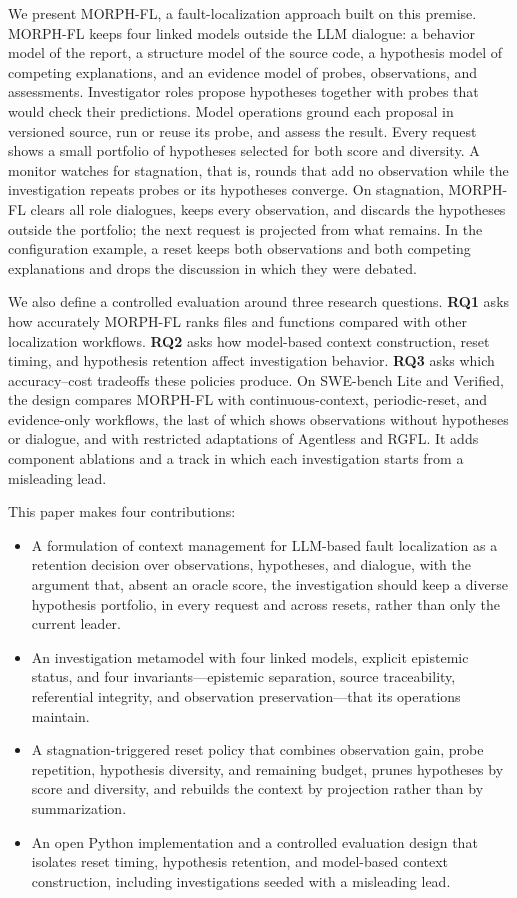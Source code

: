 \documentclass[letterpaper,journal]{IEEEtran}
\newcommand{\tool}{MORPH-FL}
\begin{document}
We present \tool{}, a fault-localization approach built on this premise. \tool{} keeps four linked models outside the LLM dialogue: a behavior model of the report, a structure model of the source code, a hypothesis model of competing explanations, and an evidence model of probes, observations, and assessments. Investigator roles propose hypotheses together with probes that would check their predictions. Model operations ground each proposal in versioned source, run or reuse its probe, and assess the result. Every request shows a small portfolio of hypotheses selected for both score and diversity. A monitor watches for stagnation, that is, rounds that add no observation while the investigation repeats probes or its hypotheses converge. On stagnation, \tool{} clears all role dialogues, keeps every observation, and discards the hypotheses outside the portfolio; the next request is projected from what remains. In the configuration example, a reset keeps both observations and both competing explanations and drops the discussion in which they were debated.

We also define a controlled evaluation around three research questions. \textbf{RQ1} asks how accurately \tool{} ranks files and functions compared with other localization workflows. \textbf{RQ2} asks how model-based context construction, reset timing, and hypothesis retention affect investigation behavior. \textbf{RQ3} asks which accuracy--cost tradeoffs these policies produce. On SWE-bench Lite and Verified, the design compares \tool{} with continuous-context, periodic-reset, and evidence-only workflows, the last of which shows observations without hypotheses or dialogue, and with restricted adaptations of Agentless and RGFL. It adds component ablations and a track in which each investigation starts from a misleading lead.

This paper makes four contributions:
\begin{itemize}
\item A formulation of context management for LLM-based fault localization as a retention decision over observations, hypotheses, and dialogue, with the argument that, absent an oracle score, the investigation should keep a diverse hypothesis portfolio, in every request and across resets, rather than only the current leader.
\item An investigation metamodel with four linked models, explicit epistemic status, and four invariants---epistemic separation, source traceability, referential integrity, and observation preservation---that its operations maintain.
\item A stagnation-triggered reset policy that combines observation gain, probe repetition, hypothesis diversity, and remaining budget, prunes hypotheses by score and diversity, and rebuilds the context by projection rather than by summarization.
\item An open Python implementation and a controlled evaluation design that isolates reset timing, hypothesis retention, and model-based context construction, including investigations seeded with a misleading lead.
\end{itemize}
\end{document}
